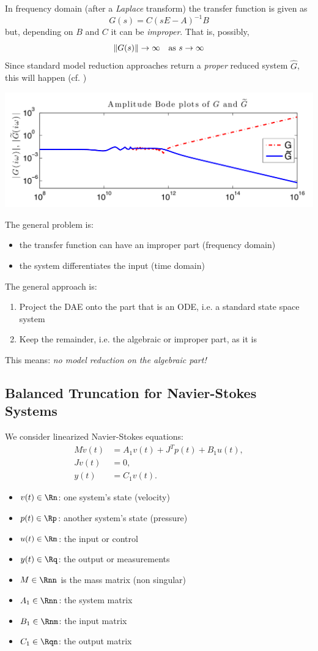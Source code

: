 	In frequency domain (after a \emph{Laplace} transform) the transfer function is given as
	$$G(s) = C(sE-A)^{-1}B$$
	but, depending on $B$ and $C$ it can be \emph{improper}. That is, possibly,
	$$\lVert G(s) \rVert \to \infty \quad\text{as }s\to \infty$$
	Since standard model reduction approaches return a \emph{proper} reduced system $\hat G$, this will happen (cf. \cite{morGugSW13})

		\includegraphics[width=\textwidth]{GugSW-properimproper}

	The general problem is:
	\begin{itemize}
		\item the transfer function can have an improper part (frequency domain)
		\item the system differentiates the input (time domain)
	\end{itemize}

	The general approach is:
	\begin{enumerate}
		\item Project the DAE onto the part that is an ODE, i.e. a standard state space system
		\item Keep the remainder, i.e. the algebraic or improper part, as it is 
	\end{enumerate}
	This means: \emph{no model reduction on the algebraic part!}

\subsection{Balanced Truncation for Navier-Stokes Systems}
  We consider linearized Navier-Stokes equations:
	\begin{align*}
		M \dot v(t) &=  A_1v(t) + J^T p(t) + B_1 u(t), \\
		Jv(t) &= 0, \\
		y(t) &= C_1v(t).
	\end{align*}

\begin{itemize}
	\item $v(t) \in \Rn$: one system's state (velocity)
	\item $p(t) \in \Rp$: another system's state (pressure)
	\item $u(t) \in \Rm$: the input or control
	\item $y(t) \in \Rq$: the output or measurements
	\item $M \in \Rnn$ is the mass matrix (non singular)
	\item $A_1 \in \Rnn$: the system matrix
	\item $B_1 \in \Rnm$: the input matrix
	\item $C_1 \in \Rqn$: the output matrix
\end{itemize}

